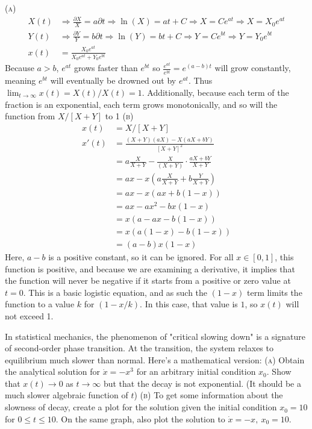 \documentclass[11pt,answers]{exam}
\begin{document}
\begin{questions}
\begin{solution}
\newline\textsc{(a)}
\begin{align*}
    X(t) &\Rightarrow \frac{\partial{X}}{X} = a\partial{t} \Rightarrow \ln(X) = at + C \Rightarrow X = Ce^{at} \Rightarrow X = X_0 e^{at} \\
    Y(t) &\Rightarrow \frac{\partial{Y}}{Y} = b\partial{t} \Rightarrow \ln(Y) = bt + C \Rightarrow Y = Ce^{bt} \Rightarrow Y = Y_0 e^{bt} \\
    x(t) &= \frac{X_0 e^{at}}{X_0e^{at} + Y_0e^{bt}}
\end{align*}
Because $a > b$, $e^{at}$ grows faster than $e^{bt}$ so $\frac{e^{at}}{e^{bt}} = e^{(a-b)t}$ will grow constantly, meaning $e^{bt}$ will eventually be drowned out by $e^{at}$.  Thus $\lim_{t\to\infty} x(t) = X(t)/X(t) = 1$.  Additionally, because each term of the fraction is an exponential, each term grows monotonically, and so will the function from $X/[X+Y]$ to 1
\newline\newline\textsc{(b)}
\begin{align*}
x(t) &= X/[X+Y] \\
x'(t) &= \frac{(X+Y)(aX) - X(aX + bY)}{[X + Y]^2} \\
&= a\frac{X}{X+ Y} - \frac{X}{(X+Y)}\cdot\frac{aX + bY}{X+Y} \\
&= ax - x\left( a\frac{X}{X+Y} + b\frac{Y}{X+Y} \right) \\
&= ax - x(ax + b(1-x)) \\
&= ax - ax^2 - bx(1-x) \\
&= x(a-ax - b(1-x)) \\
&= x(a(1-x) - b(1-x)) \\
&= (a-b)x(1-x)
\end{align*}
Here, $a-b$ is a positive constant, so it can be ignored.  For all $x \in [0,1]$, this function is positive, and because we are examining a derivative, it implies that the function will never be negative if it starts from a positive or zero value at $t=0$. This is a basic logistic equation, and as such the $(1-x)$ term limits the function to a value $k$ for $(1 - x/k)$.  In this case, that value is $1$, so $x(t)$ will not exceed 1.
\end{solution}

\item In statistical mechanics, the phenomenon of "critical slowing down" is a signature of second-order phase transition.  At the transition, the system relaxes to equilibrium much slower than normal.  Here's a mathematical version:
\newline\textsc{(a)} Obtain the analytical solution for $\dot{x} = -x^3$ for an arbitrary initial condition $x_0$.  Show that $x(t) \to 0$ as $t \to \infty$ but that the decay is not exponential. (It should be a much slower algebraic function of $t$)
\newline\textsc{(b)} To get some information about the slowness of decay, create a plot for the solution given the initial condition $x_0 = 10$ for $0 \leq t \leq 10$.  On the same graph, also plot the solution to $\dot{x} = -x, ~ x_0 = 10$. 



\end{questions}
\end{document}
